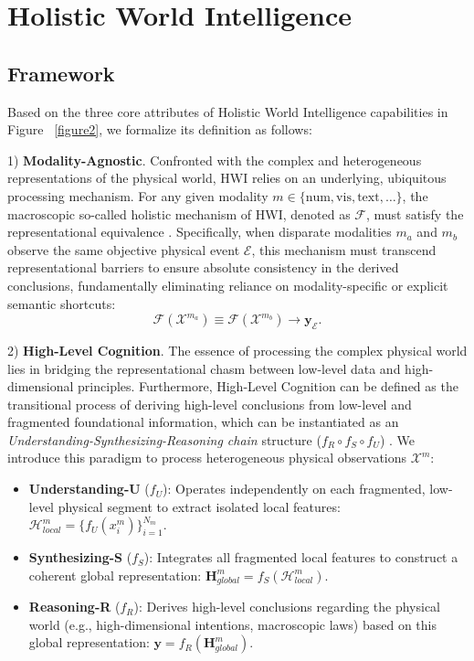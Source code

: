 \section{Holistic World Intelligence} 
\label{sec:mhlc-benchmark}
\subsection{Framework}
\label{formulation}
Based on the three core attributes of Holistic World Intelligence capabilities in Figure ~\ref{figure2}, we formalize its definition as follows:

1) \textbf{Modality-Agnostic}. Confronted with the complex and heterogeneous representations of the physical world, HWI relies on an underlying, ubiquitous processing mechanism. 
For any given modality $m \in \{\text{num}, \text{vis}, \text{text}, \dots\}$, the macroscopic so-called holistic mechanism of HWI, denoted as $\mathcal{F}$, must satisfy the representational equivalence \cite{baltruvsaitis2018multimodal}. 
Specifically, when disparate modalities $m_a$ and $m_b$ observe the same objective physical event $\mathcal{E}$, this mechanism must transcend representational barriers to ensure absolute consistency in the derived conclusions, fundamentally eliminating reliance on modality-specific or explicit semantic shortcuts:
\begin{equation}
\label{eq1}
\mathcal{F}(\mathcal{X}^{m_a}) \equiv \mathcal{F}(\mathcal{X}^{m_b}) \rightarrow \mathbf{y}_{\mathcal{E}}.
\end{equation}

2) \textbf{High-Level Cognition}. The essence of processing the complex physical world lies in bridging the representational chasm between low-level data and high-dimensional principles. Furthermore, High-Level Cognition can be defined as the transitional process of deriving high-level conclusions from low-level and fragmented foundational information, which can be instantiated as an \emph{Understanding-Synthesizing-Reasoning chain} structure ($f_R \circ f_S \circ f_U$) \cite{liu2025can}. We introduce this paradigm to process heterogeneous physical observations $\mathcal{X}^{m}$: 
\begin{itemize}[leftmargin=*]
    \item \textbf{Understanding-U} ($f_U$): Operates independently on each fragmented, low-level physical segment to extract isolated local features: $\mathcal{H}_{local}^{m} = \{ f_{U}(x_{i}^{m}) \}_{i=1}^{N_{m}}$. 
    \item \textbf{Synthesizing-S} ($f_S$): Integrates all fragmented local features to construct a coherent global representation: $\mathbf{H}_{global}^{m} = f_{S}(\mathcal{H}_{local}^{m})$.
    \item \textbf{Reasoning-R} ($f_R$): Derives high-level conclusions regarding the physical world (e.g., high-dimensional intentions, macroscopic laws) based on this global representation: $\mathbf{y} = f_{R}(\mathbf{H}_{global}^{m})$.
\end{itemize}

